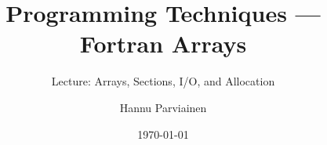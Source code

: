 

\usepackage{tikz}
\usepackage{xcolor}
\usetikzlibrary{positioning,calc}

\title{Programming Techniques — Fortran Arrays}
\subtitle{Lecture: Arrays, Sections, I/O, and Allocation}
\author{Hannu Parviainen}
\date{\today}


	
	\begin{frame}
		\titlepage
	\end{frame}





